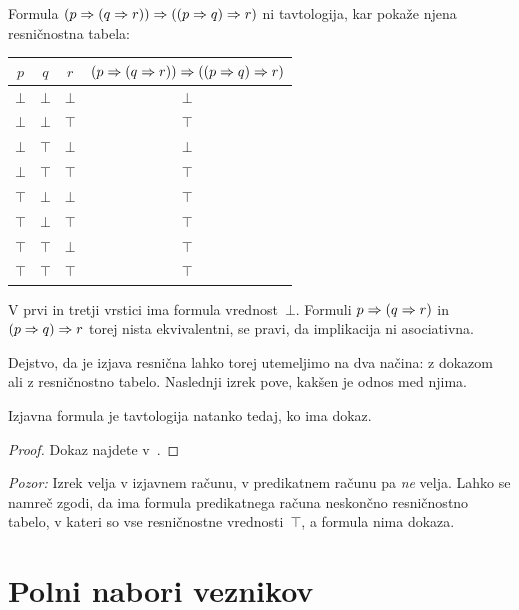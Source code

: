 \begin{zgled}
  Formula $(p \Rightarrow (q \Rightarrow r)) \Rightarrow ((p \Rightarrow q) \Rightarrow r)$ ni tavtologija, kar pokaže njena resničnostna tabela:
  \begin{center}
    \small
    \begin{tabular}{cccc}
      \toprule
      $p$ & $q$ & $r$ & $(p \Rightarrow (q \Rightarrow r)) \Rightarrow ((p \Rightarrow q) \Rightarrow r)$ \\
      \midrule
      $\bot$ & $\bot$ & $\bot$ & $\bot$ \\
      $\bot$ & $\bot$ & $\top$ & $\top$ \\
      $\bot$ & $\top$ & $\bot$ & $\bot$ \\
      $\bot$ & $\top$ & $\top$ & $\top$ \\
      $\top$ & $\bot$ & $\bot$ & $\top$ \\
      $\top$ & $\bot$ & $\top$ & $\top$ \\
      $\top$ & $\top$ & $\bot$ & $\top$ \\
      $\top$ & $\top$ & $\top$ & $\top$ \\
      \bottomrule
    \end{tabular}
  \end{center}
  V prvi in tretji vrstici ima formula vrednost~$\bot$.
  Formuli $p \Rightarrow (q \Rightarrow r)$ in $(p \Rightarrow q) \Rightarrow r$ torej nista ekvivalentni, se pravi, da implikacija ni asociativna.
\end{zgled}

Dejstvo, da je izjava resnična lahko torej utemeljimo na dva načina: z dokazom ali z resničnostno tabelo. Naslednji izrek pove, kakšen je odnos med njima.

\begin{izrek}
  \label{izrek:tavtologija-iff-dokazljiva}
  Izjavna formula je tavtologija natanko tedaj, ko ima dokaz.
\end{izrek}

\begin{proof}
  Dokaz najdete v~\cite{prijatelj92:_osnov}.
\end{proof}

\noindent
%
\emph{Pozor:}
%
Izrek velja v izjavnem računu, v predikatnem računu pa \emph{ne} velja. Lahko se namreč zgodi, da ima formula predikatnega računa neskončno resničnostno tabelo, v kateri so vse resničnostne vrednosti~$\top$, a formula nima dokaza.

\section{Polni nabori veznikov}

